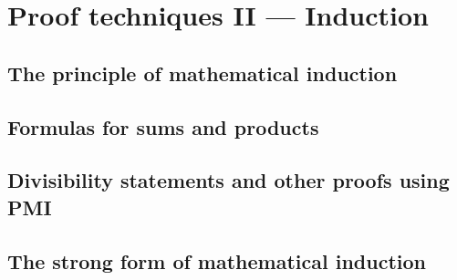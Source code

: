 
\chapter{Proof techniques II --- Induction}


\section{The principle of mathematical induction}
\label{sec:induct}






 
\newpage

\section{Formulas for sums and products}





\newpage

\section[Other proofs using PMI]{Divisibility statements and other proofs using PMI}





\newpage
 
\section{The strong form of mathematical induction}






